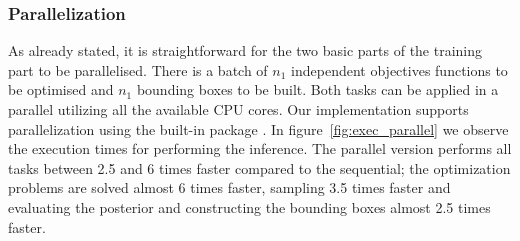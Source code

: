 \subsubsection*{Parallelization}

As already stated, it is straightforward for the two basic parts of
the training part to be parallelised. There is a batch of \(n_1\)
independent objectives functions to be optimised and \(n_1\) bounding
boxes to be built. Both tasks can be applied in a parallel utilizing
all the available CPU cores. Our implementation supports
parallelization using the built-in  package
. In figure~\ref{fig:exec_parallel} we observe the
execution times for performing the inference. The parallel version
performs all tasks between 2.5 and 6 times faster compared to the
sequential; the optimization problems are solved almost 6 times
faster, sampling 3.5 times faster and evaluating the posterior and
constructing the bounding boxes almost 2.5 times faster.

